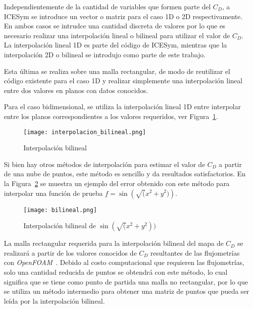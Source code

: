 

Independientemente de la cantidad de variables que formen parte del $C_{D}$, a
ICESym se introduce un vector o matriz para el caso 1D o 2D respectivamente.
%
En ambos casos se intrudce una cantidad discreta de valores por lo que es
necesario realizar una interpolación lineal o bilineal para utilizar el valor de
$C_{D}$.
%
La interpolación lineal 1D es parte del código de ICESym, mientras que la
interpolación 2D o bilineal se introdujo como parte de este trabajo.

Esta última se realiza sobre una malla rectangular, de modo de reutilizar el
código existente para el caso 1D y realizar  simplemente una interpolación
lineal entre dos valores en planos con datos conocidos.

%
Para el caso bidimensional, se utiliza la interpolación lineal 1D entre
interpolar entre los planos correspondientes a los valores requeridos, ver
Figura~\ref{fig:interp_bilineal}.

\begin{figure}
    \centering
    \texttt{[image: interpolacion\_bilineal.png]}
    \caption{Interpolación bilineal\protect\footnotemark}\label{fig:interp_bilineal}
\end{figure}


Si bien hay otros métodos de interpolación para estimar el valor de $C_D$ a
partir de una nube de puntos, este método es sencillo y da resultados
satisfactorios.
%
En la Figura~\ref{fig:bilineal} se muestra un ejemplo del error obtenido con
este método para interpolar una función de prueba $f=\sin\left(\sqrt(x^2 + y^2)\right)$.

\begin{figure}
    \centering
    \texttt{[image: bilineal.png]}
    \caption{Interpolación bilineal de $\sin(\sqrt(x^2 + y^2))$}\label{fig:bilineal}
\end{figure}

La malla rectangular requerida para la interpolación bilineal del mapa de
$C_{D}$ se realizará a partir de los valores conocidos de $C_D$ resultantes de
las flujometrías con \emph{OpenFOAM}~\parencite{openfoam}.
%
Debido al costo computacional que requieren las flujometrías, solo una cantidad
reducida de puntos se obtendrá con este método, lo cual significa que se tiene
como punto de partida una malla no rectangular, por lo que se utiliza un método
intermedio para obtener una matriz de puntos que pueda ser leída por la
interpolación bilineal.

